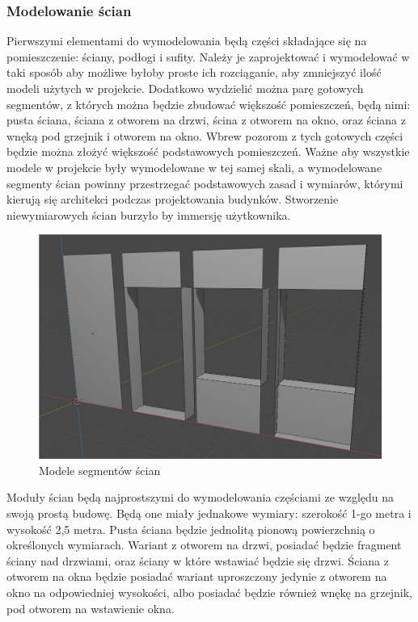 \documentclass{article} %
\begin{document}
        \subsubsection{Modelowanie ścian}
            Pierwszymi elementami do wymodelowania będą części składające się na pomieszczenie: ściany, podłogi i sufity. Należy je zaprojektować i wymodelować w taki sposób aby możliwe byłoby proste ich rozciąganie, aby zmniejszyć ilość modeli użytych w projekcie. Dodatkowo wydzielić można parę gotowych segmentów, z których można będzie zbudować większość pomieszczeń, będą nimi: pusta ściana, ściana z otworem na drzwi, ścina z otworem na okno, oraz ściana z wnęką pod grzejnik i otworem na okno. Wbrew pozorom z tych gotowych części będzie można złożyć większość podstawowych pomieszczeń. Ważne aby wszystkie modele w projekcie były wymodelowane w tej samej skali, a wymodelowane segmenty ścian powinny przestrzegać podstawowych zasad i wymiarów, którymi kierują się architekci podczas projektowania budynków. Stworzenie niewymiarowych ścian burzyło by immersję użytkownika.
            \\
            
            
            \begin{figure}[!h]
            \centering
            \includegraphics[scale=0.3]{images/screenshots/work/work.png}
            \caption{Modele segmentów ścian}
            \label{Tab.}
            \end{figure}


            
            Moduły ścian będą najprostszymi do wymodelowania częściami ze względu na swoją prostą budowę. Będą one miały jednakowe wymiary: szerokość 1-go metra i wysokość 2,5 metra. Pusta ściana będzie jednolitą pionową powierzchnią o określonych wymiarach. Wariant z otworem na drzwi, posiadać będzie fragment ściany nad drzwiami, oraz ściany w które wstawiać będzie się drzwi. Ściana z otworem na okna będzie posiadać wariant uproszczony jedynie z otworem na okno na odpowiedniej wysokości, albo posiadać będzie również wnękę na grzejnik, pod otworem na wstawienie okna.
            \\
            
\end{document}

